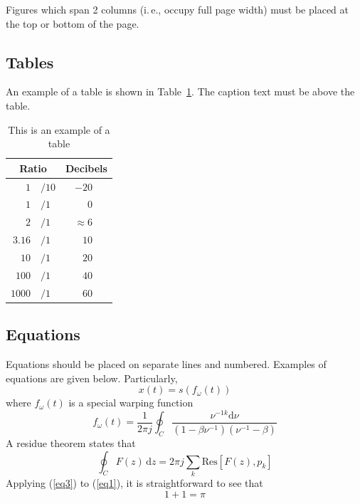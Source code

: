 \documentclass[a4paper]{article}
\begin{document}
Figures which span 2 columns (i.\,e., occupy full page width) must be placed at the top or bottom of the page.

\subsection{Tables}

An example of a table is shown in Table~\ref{tab:example}. The caption text must be above the table.

\begin{table}[th]
  \caption{This is an example of a table}
  \label{tab:example}
  \centering
  \begin{tabular}{ r@{}l  r }
    \toprule
    \multicolumn{2}{c}{\textbf{Ratio}} & 
                                         \multicolumn{1}{c}{\textbf{Decibels}} \\
    \midrule
    $1$                       & $/10$ & $-20$~~~             \\
    $1$                       & $/1$  & $0$~~~               \\
    $2$                       & $/1$  & $\approx 6$~~~       \\
    $3.16$                    & $/1$  & $10$~~~              \\
    $10$                      & $/1$  & $20$~~~              \\
    $100$                     & $/1$  & $40$~~~              \\
    $1000$                    & $/1$  & $60$~~~              \\
    \bottomrule
  \end{tabular}
  
\end{table}

\subsection{Equations}

Equations should be placed on separate lines and numbered. Examples of equations are given below. Particularly,
% 
\begin{equation}
  x(t) = s(f_\omega(t))
  \label{eq1}
\end{equation}
% 
where \(f_\omega(t)\) is a special warping function
% 
\begin{equation}
  f_\omega(t) = \frac{1}{2 \pi j} \oint_C 
  \frac{\nu^{-1k} \mathrm{d} \nu}
  {(1-\beta\nu^{-1})(\nu^{-1}-\beta)}
  \label{eq2}
\end{equation}
% 
A residue theorem states that
% 
\begin{equation}
  \oint_C F(z)\,\mathrm{d}z = 2 \pi j \sum_k \mathrm{Res}[F(z),p_k]
  \label{eq3}
\end{equation}
% 
Applying (\ref{eq3}) to (\ref{eq1}), it is straightforward to see that
% 
\begin{equation}
  1 + 1 = \pi
  \label{eq4}
\end{equation}
\end{document}
